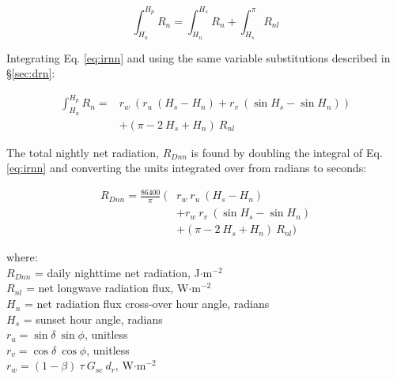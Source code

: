 \begin{equation}
\label{eq:irnn}
	\int_{H_n}^{H_p} R_{n} = \int_{H_n}^{H_s} R_n + \int_{H_s}^{\pi} R_{nl}
\end{equation}

\noindent Integrating Eq. \ref{eq:irnn} and using the same variable substitutions described in \S \ref{sec:drn}:

\begin{equation}
\label{eq:intrnn}
	\begin{split}
		\int_{H_n}^{H_p} R_{n} = & r_w\: \left( r_u\: (H_s-H_n) + 
		r_v\: (\sin H_s - \sin H_n) \right) \\
		& + \left(\pi- 2\: H_s + H_n \right)\: R_{nl} 
	\end{split}
\end{equation}

\noindent The total nightly net radiation, $R_{Dnn}$ is found by doubling the integral of Eq. \ref{eq:irnn} and converting the units integrated over from radians to seconds:

\begin{equation}
\label{eq:dayrnn}
	\begin{split}
		R_{Dnn} = \frac{86400}{\pi}\: ( & r_w\: r_u\: (H_s-H_n) \\
		                      & + r_w\: r_v\: (\sin H_s - \sin H_n) \\
	                  & + \left(\pi - 2\: H_s  + H_n\right)\: R_{nl} )
	\end{split}
\end{equation}

\noindent where: \\
\indent $R_{Dnn}$ = daily nighttime net radiation, J$\cdot$m$^{-2}$\\
\indent $R_{nl}$ = net longwave radiation flux, W$\cdot$m$^{-2}$\\
\indent $H_n$ = net radiation flux cross-over hour angle, radians\\
\indent $H_s$ = sunset hour angle, radians\\
\indent $r_u = \sin\delta\: \sin\phi$, unitless \\
\indent $r_v = \cos\delta\: \cos\phi$, unitless \\
\indent $r_w = \left(1-\beta\right)\:\tau\: G_{sc}\: d_r$, W$\cdot$m$^{-2}$\\

